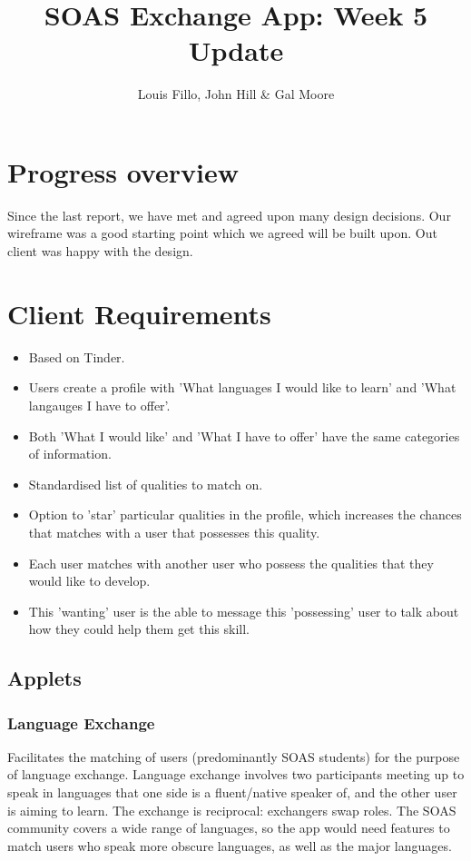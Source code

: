 \documentclass[11pt]{article}
\title{SOAS Exchange App: Week 5 Update}
\author{Louis Fillo, John Hill & Gal Moore}
\begin{document}
\maketitle

\section{Progress overview}
Since the last report, we have met  and agreed upon many design decisions. Our wireframe was a good starting point which we agreed will be built upon. Out client was happy with the design. 

\section{Client Requirements}
\begin{itemize}
   \item Based on Tinder.
   \item Users create a profile with 'What languages I would like to learn' and 'What langauges I have to offer'.
   \item Both 'What I would like' and 'What I have to offer' have the same categories of information.
   \item Standardised list of qualities to match on.
   \item Option to 'star' particular qualities in the profile, which increases the chances that matches with a user that possesses this quality.
   \item Each user matches with another user who possess the qualities that they would like to develop.
   \item This 'wanting' user is the able to message this 'possessing' user to talk about how they could help them get this skill.
\end{itemize}

\subsection{Applets}
\subsubsection{Language Exchange}
Facilitates the matching of users (predominantly SOAS students) for the purpose of language exchange.  Language exchange involves two participants meeting up to speak in languages that one side is a fluent/native speaker of, and the other user is aiming to learn.  The exchange is reciprocal: exchangers swap roles.  The SOAS community covers a wide range of languages, so the app would need features to match users who speak more obscure languages, as well as the major languages.
\end{document}
